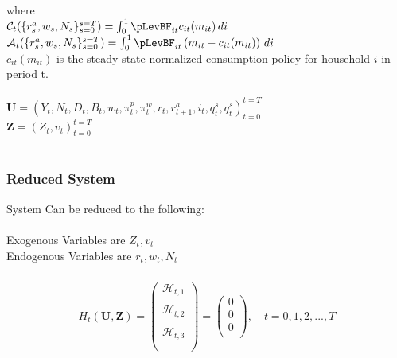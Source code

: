 \documentclass[titlepage]{\econtex}\providecommand{\texname}{BufferStockTheory}
\begin{document}
 
 where \\
 
 $\mathcal{C}_{t}(\{r_{s}^{a} ,w_{s}, N_{s}\}_{s=0}^{s=T}) = \int_{0}^{1} \pLevBF_{it} c_{it}(m_{it})\, di $ \\
 
 $\mathcal{A}_{t}(\{r_{s}^{a} ,w_{s}, N_{s}\}_{s=0}^{s=T}) = \int_{0}^{1} \pLevBF_{it} \left(m_{it} - c_{it}(m_{it})\right)\, di $ \\
 
$c_{it}(m_{it})$ is the steady state normalized consumption policy for household $i$ in period t. \\ \\
 

 
 
 $\mathbf{U} = \left(Y_{t} , N_{t} ,  D_{t
 }, B_{t}, w_{t} , \pi_{t}^{p} ,\pi_{t}^{w}, r_{t} , r_{t+1}^{a}, i_{t} , q_{t}^{s},  q_{t}^{s} \right)_{t=0}^{t=T}$ \\ 

 
 $\mathbf{Z} = \left(Z_{t} ,v_{t}\right)_{t=0}^{t=T}$ \\ \\
 
 
\hypertarget{Reduced System}{}
\subsubsection{Reduced System}
 
 System Can be reduced to the following: \\ \\
 
Exogenous Variables are $ Z_{t}, v_{t}$ \\ 

Endogenous Variables are $ r_{t} , w_{t} ,N_{t}$ \\ \\

\begin{eqnarray} 
H_{t}(\mathbf{U},\mathbf{Z})= \begin{pmatrix} 
\mathcal{H}_{t,1} \\ \\ 
\mathcal{H}_{t,2} \\ \\
\mathcal{H}_{t,3} \\ \\
 \end{pmatrix} = \begin{pmatrix} 0 \\ 0 \\ 0 \\ \end{pmatrix} , \quad  t = 0, 1, 2, ..., T 
 \end{eqnarray}
 
\end{document}
